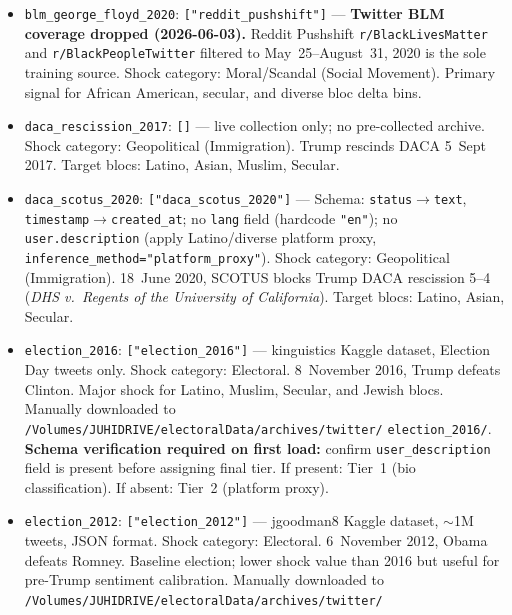 \documentclass[11pt]{article}
\begin{document}
\begin{taskbox}
{\begin{itemize}[leftmargin=1.6em, itemsep=1pt]
    \item \texttt{blm\_george\_floyd\_2020}: \texttt{["reddit\_pushshift"]} ---
          \textbf{Twitter BLM coverage dropped (2026-06-03).}
          Reddit Pushshift \texttt{r/BlackLivesMatter} and
          \texttt{r/BlackPeopleTwitter} filtered to May~25--August~31, 2020
          is the sole training source.
          Shock category: Moral/Scandal (Social Movement).
          Primary signal for African American, secular, and diverse bloc delta bins.
    \item \texttt{daca\_rescission\_2017}: \texttt{[]} --- live collection only;
          no pre-collected archive. Shock category: Geopolitical (Immigration).
          Trump rescinds DACA 5~Sept 2017. Target blocs: Latino, Asian,
          Muslim, Secular.
    \item \texttt{daca\_scotus\_2020}: \texttt{["daca\_scotus\_2020"]} ---
          Schema: \texttt{status}$\to$\texttt{text},
          \texttt{timestamp}$\to$\texttt{created\_at};
          no \texttt{lang} field (hardcode \texttt{"en"});
          no \texttt{user.description} (apply Latino/diverse platform proxy,
          \texttt{inference\_method="platform\_proxy"}).
          Shock category: Geopolitical (Immigration). 18~June 2020,
          SCOTUS blocks Trump DACA rescission 5--4 (\emph{DHS v.\ Regents of
          the University of California}). Target blocs: Latino, Asian, Secular.
    \item \texttt{election\_2016}: \texttt{["election\_2016"]} ---
          kinguistics Kaggle dataset, Election Day tweets only.
          Shock category: Electoral. 8~November 2016, Trump defeats Clinton.
          Major shock for Latino, Muslim, Secular, and Jewish blocs.
          Manually downloaded to
          \texttt{/Volumes/JUHIDRIVE/electoralData/archives/twitter/}\allowbreak
          \texttt{election\_2016/}.
          \textbf{Schema verification required on first load:} confirm
          \texttt{user\_description} field is present before assigning final
          tier. If present: Tier~1 (bio classification). If absent: Tier~2
          (platform proxy).
    \item \texttt{election\_2012}: \texttt{["election\_2012"]} ---
          jgoodman8 Kaggle dataset, $\sim$1M tweets, JSON format.
          Shock category: Electoral. 6~November 2012, Obama defeats Romney.
          Baseline election; lower shock value than 2016 but useful for
          pre-Trump sentiment calibration.
          Manually downloaded to
          \texttt{/Volumes/JUHIDRIVE/electoralData/archives/twitter/}\allowbreak

\end{itemize}}
\end{taskbox}
\end{document}
